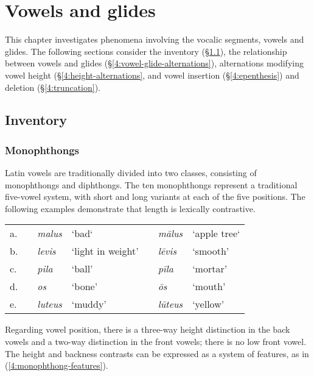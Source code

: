 \chapter{Vowels and glides}
\label{vowels}

This chapter investigates phenomena involving the vocalic segments, vowels and glides.
The following sections consider the inventory (\S\ref{4:inventory}), the relationship between vowels and glides (\S\ref{4:vowel-glide-alternations}), alternations modifying vowel height (\S\ref{4:height-alternations}, and vowel insertion (\S\ref{4:epenthesis}) and deletion (\S\ref{4:truncation}).

\section{Inventory}
\label{4:inventory}

\subsection{Monophthongs}

Latin vowels are traditionally divided into two classes, consisting of monophthongs and diphthongs.
The ten monophthongs represent a traditional five-vowel system, with short and long variants at each of the five positions.
The following examples demonstrate that length is lexically contrastive.

\begin{example}
\begin{tabular}{l c ll c ll}

a. && \emph{malus}  & `bad`             && \emph{mālus}  & `apple tree`  \\
b. && \emph{levis}  & `light in weight' && \emph{lēvis}  & `smooth' \\
c. && \emph{pila}   & `ball'            && \emph{pīla}   & `mortar' \\
d. && \emph{os}     & `bone'            && \emph{ōs}     & `mouth'  \\
e. && \emph{luteus} & `muddy'           && \emph{lūteus} & `yellow'
\end{tabular}
\end{example}

Regarding vowel position, there is a three-way height distinction in the back vowels and a two-way distinction in the front vowels; there is no low front vowel.
The height and backness contrasts can be expressed as a system of features, as in (\ref{4:monophthong-features}).

